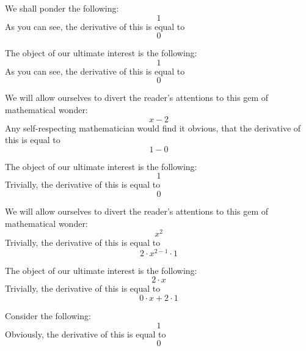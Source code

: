 \documentclass{article}
\begin{document}
We shall ponder the following:
\begin{equation}
1 
\end{equation}
As you can see, the derivative of this is equal to
\begin{equation}
0 
\end{equation}

The object of our ultimate interest is the following:
\begin{equation}
1 
\end{equation}
As you can see, the derivative of this is equal to
\begin{equation}
0 
\end{equation}

We will allow ourselves to divert the reader's attentions to this gem of mathematical wonder:
\begin{equation}
x - 2 
\end{equation}
Any self-respecting mathematician would find it obvious, that the derivative of this is equal to
\begin{equation}
1 - 0 
\end{equation}

The object of our ultimate interest is the following:
\begin{equation}
1 
\end{equation}
Trivially, the derivative of this is equal to
\begin{equation}
0 
\end{equation}

We will allow ourselves to divert the reader's attentions to this gem of mathematical wonder:
\begin{equation}
x ^{2 } 
\end{equation}
Trivially, the derivative of this is equal to
\begin{equation}
2 \cdot x ^{2 - 1 } \cdot 1 
\end{equation}

The object of our ultimate interest is the following:
\begin{equation}
2 \cdot x 
\end{equation}
Trivially, the derivative of this is equal to
\begin{equation}
0 \cdot x + 2 \cdot 1 
\end{equation}

Consider the following:
\begin{equation}
1 
\end{equation}
Obviously, the derivative of this is equal to
\begin{equation}
0 
\end{equation}
\end{document}
